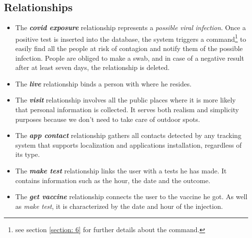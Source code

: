 \subsection{Relationships}
\begin{itemize}
    \item The \textit{\textbf{covid exposure}} relationship represents a \emph{possible viral infection}. Once a positive test is inserted into the database, the system triggers a command\footnote{see section \ref{section: 6} for further details about the command.} to easily find all the people at risk of contagion and notify them of the possible infection. People are obliged to make a swab, and in case of a negative result after at least seven days, the relationship is deleted.
    \item The \textit{\textbf{live}} relationship binds a person with where he resides.
    \item The \textit{\textbf{visit}} relationship involves all the public places where it is more likely that personal information is collected. It serves both realism and simplicity purposes because we don't need to take care of outdoor spots.
    \item The \textit{\textbf{app contact}} relationship gathers all contacts detected by any tracking system that supports localization and applications installation, regardless of its type.
    \item The \textit{\textbf{make test}} relationship links the user with a tests he has made. It contains information such as the hour, the date and the outcome.
    \item The \textit{\textbf{get vaccine}} relationship connects the user to the vaccine he got. As well as \emph{make test}, it is characterized by the date and hour of the injection.
\end{itemize}